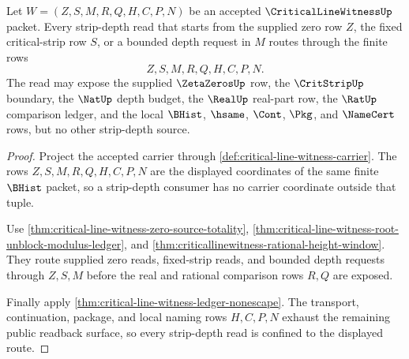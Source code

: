 \begin{theorem}
\label{thm:critical-line-witness-strip-depth-readback-totality}
Let $W=(Z,S,M,R,Q,H,C,P,N)$ be an accepted $\CriticalLineWitnessUp$ packet. Every strip-depth read that starts from the supplied zero row $Z$, the fixed critical-strip row $S$, or a bounded depth request in $M$ routes through the finite rows
$$
Z,S,M,R,Q,H,C,P,N.
$$
The read may expose the supplied $\ZetaZerosUp$ row, the $\CritStripUp$ boundary, the $\NatUp$ depth budget, the $\RealUp$ real-part row, the $\RatUp$ comparison ledger, and the local $\BHist$, $\hsame$, $\Cont$, $\Pkg$, and $\NameCert$ rows, but no other strip-depth source.
\end{theorem}
\begin{proof}
Project the accepted carrier through \autoref{def:critical-line-witness-carrier}. The rows $Z,S,M,R,Q,H,C,P,N$ are the displayed coordinates of the same finite $\BHist$ packet, so a strip-depth consumer has no carrier coordinate outside that tuple.

Use \autoref{thm:critical-line-witness-zero-source-totality}, \autoref{thm:critical-line-witness-root-unblock-modulus-ledger}, and \autoref{thm:criticallinewitness-rational-height-window}. They route supplied zero reads, fixed-strip reads, and bounded depth requests through $Z,S,M$ before the real and rational comparison rows $R,Q$ are exposed.

Finally apply \autoref{thm:critical-line-witness-ledger-nonescape}. The transport, continuation, package, and local naming rows $H,C,P,N$ exhaust the remaining public readback surface, so every strip-depth read is confined to the displayed route.
\end{proof}

